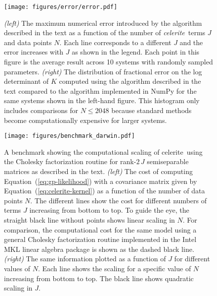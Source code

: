 \documentclass[manuscript, letterpaper]{aastex6}
\newcommand{\project}[1]{\textsf{#1}}
\newcommand{\celerite}{\project{celerite}}
\newcommand{\celeriteterm}{\emph{celerite}}
\newcommand{\figurelabel}[1]{\label{fig:#1}}
\renewcommand{\eqref}[1]{\ref{eq:#1}}
\newcommand{\Eq}[1]{Equation~(\eqref{#1})}
\newcommand{\eq}[1]{\Eq{#1}}
\begin{document}
{\begin{figure}[tp]
    \begin{center}
        \texttt{[image: figures/error/error.pdf]}
        \caption{\emph{(left)} The maximum numerical error introduced by the algorithm
            described in the text as a function of the number of \celeriteterm\ terms
            $J$ and data points $N$.
            Each line corresponds to a different $J$ and the error increases with $J$
            as shown in the legend.
            Each point in this figure is the average result across 10 systems with
            randomly sampled parameters.
            \emph{(right)} The distribution of fractional error on the log determinant of
            $K$ computed using the algorithm described in the text compared to the
            algorithm implemented in \project{NumPy} \citep{Van-Der-Walt:2011} for the
            same systems shown in the left-hand figure.
            This histogram only includes comparisons for $N \le 2048$ because standard
            methods become computationally expensive for larger systems.
            \figurelabel{error}}
    \end{center}
\end{figure}

\begin{figure}[tp]
    \begin{center}
        \texttt{[image: figures/benchmark\_darwin.pdf]}
        \caption{A benchmark showing the computational scaling of \celerite\ using the
            Cholesky factorization routine for rank-$2\,J$ semiseparable matrices as
            described in the text.
            \emph{(left)} The cost of computing \eq{gp-likelihood} with a covariance
            matrix given by \eq{celerite-kernel} as a function of the number of data
            points $N$.
            The different lines show the cost for different numbers of terms $J$
            increasing from bottom to top.
            To guide the eye, the straight black line without points
            shows linear scaling in $N$.
            For comparison, the computational cost for the same model using a general
            Cholesky factorization routine implemented in the Intel MKL linear algebra
            package is shown as the dashed black line.
            \emph{(right)} The same information plotted as a function of $J$ for
            different values of $N$.
            Each line shows the scaling for a specific value of $N$ increasing from
            bottom to top.
            The black line shows quadratic scaling in $J$.
            \figurelabel{benchmark}}
    \end{center}
\end{figure}

}
\end{document}
